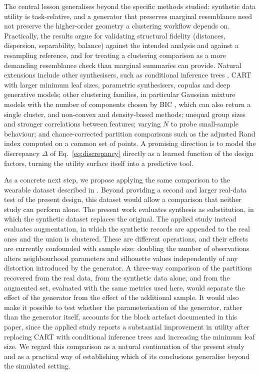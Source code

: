 \documentclass[pdflatex,referee]{sn-jnl}
\begin{document}
The central lesson generalises beyond the specific methods studied: synthetic
data utility is task-relative, and a generator that preserves marginal
resemblance need not preserve the higher-order geometry a clustering workflow
depends on. Practically, the results argue for validating structural fidelity
(distances, dispersion, separability, balance) against the intended analysis
and against a resampling reference, and for treating a clustering comparison
as a more demanding resemblance check than marginal summaries can provide.
Natural extensions include other synthesisers, such as conditional inference
trees \citep{hothorn2006}, CART with larger minimum leaf sizes, parametric
synthesisers, copulas and deep generative models; other clustering families,
in particular Gaussian mixture models with the number of components chosen by
BIC \citep{fraley2002,scrucca2016}, which can also return a single cluster, and
non-convex and density-based methods; unequal group sizes and stronger
correlations between features; varying $N$ to probe small-sample behaviour;
and chance-corrected partition comparisons such as the adjusted Rand index
\citep{hubert1985} computed on a common set of points. A promising direction
is to model the discrepancy $\Delta$ of Eq.~\eqref{eq:discrepancy} directly as
a learned function of the design factors, turning the utility surface itself
into a predictive tool.

As a concrete next step, we propose applying the same comparison to the
wearable dataset described in
\citet{vidiella2025}. Beyond providing a second and larger real-data test of the present design, this dataset
would allow a comparison that neither study can perform alone. The present work
evaluates synthesis as substitution, in which the synthetic dataset replaces
the original. The applied study instead evaluates augmentation, in which the
synthetic records are appended to the real ones and the union is clustered.
These are different operations, and their effects are currently confounded
with sample size: doubling the number of observations alters neighbourhood
parameters and silhouette values independently of any distortion introduced by
the generator. A three-way comparison of the partitions recovered from the real
data, from the synthetic data alone, and from the augmented set, evaluated with
the same metrics used here, would separate the effect of the generator from
the effect of the additional sample. It would also make it possible to test
whether the parameterisation of the generator, rather than the generator
itself, accounts for the block artefact documented in this paper, since the
applied study reports a substantial improvement in utility after replacing
CART with conditional inference trees \citep{hothorn2006} and increasing the
minimum leaf size. We regard this comparison as a natural continuation of the
present study and as a practical way of establishing which of its conclusions
generalise beyond the simulated setting.
\end{document}
